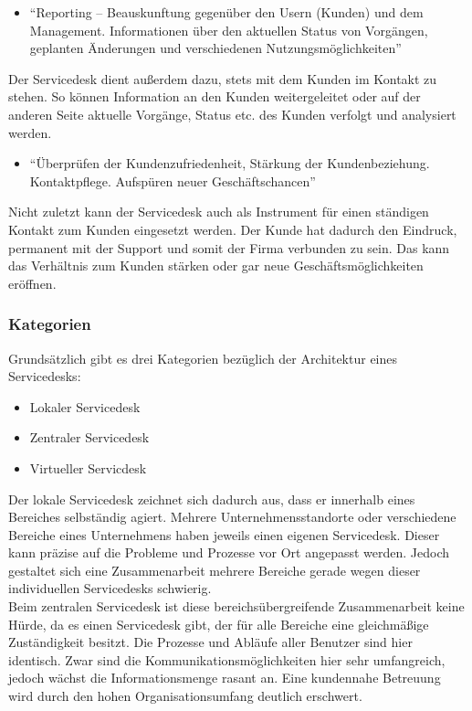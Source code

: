 \begin{itemize}
\item \enquote{Reporting – Beauskunftung gegenüber den Usern (Kunden)
und dem Management. Informationen über den aktuellen
Status von Vorgängen, geplanten Änderungen und
verschiedenen Nutzungsmöglichkeiten}
\end{itemize}
\noindent
Der Servicedesk dient außerdem dazu, stets mit dem Kunden im Kontakt zu stehen. So können Information an den Kunden weitergeleitet oder auf der anderen Seite aktuelle Vorgänge, Status etc. des Kunden verfolgt und analysiert werden. 

\begin{itemize}
\item \enquote{Überprüfen der Kundenzufriedenheit, Stärkung der Kundenbeziehung.
Kontaktpflege. Aufspüren neuer Geschäftschancen}
\end{itemize}
\noindent
Nicht zuletzt kann der Servicedesk auch als Instrument für einen ständigen Kontakt zum Kunden eingesetzt werden. Der Kunde hat dadurch den Eindruck, permanent mit der Support und somit der Firma verbunden zu sein. Das kann das Verhältnis zum Kunden stärken oder gar neue Geschäftsmöglichkeiten eröffnen.\\


\subsubsection{Kategorien}

\noindent
Grundsätzlich gibt es drei Kategorien bezüglich der Architektur eines Servicedesks:

\begin{itemize}
\item Lokaler Servicedesk
\item Zentraler Servicedesk
\item Virtueller Servicdesk
\end{itemize}

\noindent
Der lokale Servicedesk zeichnet sich dadurch aus, dass er innerhalb eines Bereiches selbständig agiert. Mehrere Unternehmensstandorte oder verschiedene Bereiche eines Unternehmens haben jeweils einen eigenen Servicedesk. Dieser kann präzise auf die Probleme und Prozesse vor Ort angepasst werden. Jedoch gestaltet sich eine Zusammenarbeit mehrere Bereiche gerade wegen dieser individuellen Servicedesks schwierig. \\

\noindent
Beim zentralen Servicedesk ist diese bereichsübergreifende Zusammenarbeit keine Hürde, da es einen Servicedesk gibt, der für alle Bereiche eine gleichmäßige Zuständigkeit besitzt. Die Prozesse und Abläufe aller Benutzer sind hier identisch. Zwar sind die Kommunikationsmöglichkeiten hier sehr umfangreich, jedoch wächst die Informationsmenge rasant an. Eine kundennahe Betreuung wird durch den hohen Organisationsumfang deutlich erschwert. \\

